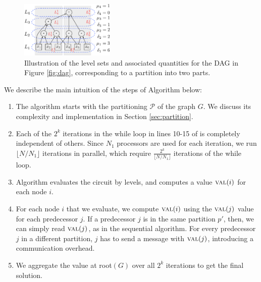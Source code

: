 \begin{figure}[h]
\includegraphics[width=0.4\textwidth]{img/dag4.pdf}
\caption{
\small
Illustration of the level sets and associated quantities for the DAG in
Figure \ref{fig:dag}, corresponding to a partition into two parts. 
}
\label{fig:dag4}
\end{figure}

We describe the main intuition of the steps of Algorithm \parmaxwt{} below:
\begin{enumerate}
\item
The algorithm starts with the partitioning $\mathcal{P}$ of the graph $G$.
We discuss its complexity and implementation in Section \ref{sec:partition}.
\item
Each of the $2^k$ iterations in the while loop in lines 10-15 of \maxwt{}
is completely independent of others. Since $N_1$ processors are used for each iteration,
we run $\lfloor{N/N_1}\rfloor$ iterations in parallel, which require $\frac{2^k}{\lfloor{N/N_1}\rfloor}$
iterations of the while loop.
\item
Algorithm \parcircuit{} evaluates the circuit by levels, and computes
a value $\textsc{val}(i)$ for each node $i$.
\item
For each node $i$ that we evaluate, we compute $\textsc{val}(i)$ using the $\textsc{val}(j)$ value for each predecessor $j$. 
If a predecessor $j$ is in the same partition $p'$, then, we can simply read $\textsc{val}(j)$, 
as in the sequential algorithm. For every predecessor $j$ in a different partition, 
$j$ has to send a message with $\textsc{val}(j)$, introducing a communication overhead.
\item
We aggregate the value at root$(G)$ over all $2^{k}$ iterations to get the final solution.
\end{enumerate}


